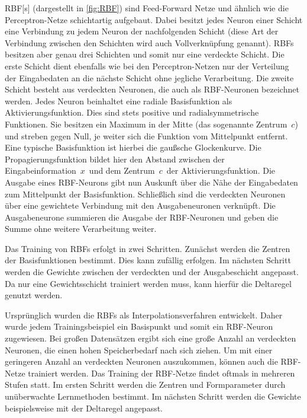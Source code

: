 \gls{RBF}[s] (dargestellt in \autoref{fig:RBF}) sind Feed-Forward Netze und ähnlich wie die Perceptron-Netze schichtartig aufgebaut. Dabei besitzt jedes Neuron einer Schicht eine Verbindung zu jedem Neuron der nachfolgenden Schicht (diese Art der Verbindung zwischen den Schichten wird auch Vollverknüpfung genannt). RBFs besitzen aber genau drei Schichten und somit nur eine verdeckte Schicht. Die erste Schicht dient ebenfalls wie bei den Perceptron-Netzen nur der Verteilung der Eingabedaten an die nächste Schicht ohne jegliche Verarbeitung. Die zweite Schicht besteht aus verdeckten Neuronen, die auch als RBF-Neuronen  bezeichnet werden. Jedes Neuron beinhaltet eine radiale Basisfunktion als Aktivierungsfunktion. Dies sind stets positive und radialsymmetrische Funktionen. Sie besitzen ein Maximum in der Mitte (das sogenannte Zentrum~$c$) und streben gegen Null, je weiter sich die Funktion vom Mittelpunkt entfernt. Eine typische Basisfunktion ist hierbei die gaußsche Glockenkurve. Die Propagierungsfunktion bildet hier den Abstand zwischen der Eingabeinformation~$x$~und dem Zentrum~$c$~der Aktivierungsfunktion. Die Ausgabe eines RBF-Neurons gibt nun Auskunft über die Nähe der Eingabedaten zum Mittelpunkt der Basisfunktion. Schließlich sind die verdeckten Neuronen über eine gewichtete Verbindung mit den Ausgabeneuronen  verknüpft. Die Ausgabeneurone summieren die Ausgabe der RBF-Neuronen und geben die Summe ohne weitere Verarbeitung weiter. 

Das Training von RBFs erfolgt in zwei Schritten. Zunächst werden die Zentren der Basisfunktionen bestimmt. Dies kann zufällig erfolgen. Im nächsten Schritt werden die Gewichte zwischen der verdeckten und der Ausgabeschicht angepasst. Da nur eine Gewichtsschicht trainiert werden muss, kann hierfür die Deltaregel genutzt werden.

Ursprünglich wurden die RBFs als Interpolationsverfahren entwickelt. Daher wurde jedem Trainingsbeispiel ein Basispunkt und somit ein RBF-Neuron zugewiesen. Bei großen Datensätzen ergibt sich eine große Anzahl an verdeckten Neuronen, die einen hohen Speicherbedarf nach sich ziehen. Um mit einer geringeren Anzahl an verdeckten Neuronen auszukommen, können auch die RBF-Netze trainiert werden. Das Training der RBF-Netze findet oftmals in mehreren Stufen statt. Im ersten Schritt werden die Zentren und Formparameter durch unüberwachte Lernmethoden bestimmt. Im nächsten Schritt werden die Gewichte beispielsweise mit der Deltaregel angepasst.

